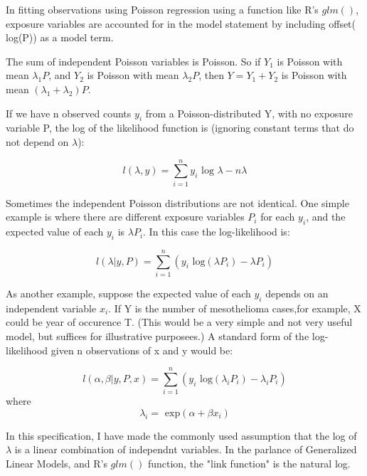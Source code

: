 \documentclass[paper=letter,listof=leveldown,appendixprefix=true]{scrreprt}\usepackage{graphicx, color}
\begin{document}
In fitting observations using Poisson regression using a function like R's $glm()$, exposure variables are accounted for in the model statement by including offset( log(P)) as a model term.

The sum of independent Poisson variables is Poisson.  So if $Y_1$ is Poisson with mean $\lambda_1 P$, and $ Y_2$ is Poisson with mean $ \lambda_2 P$, then $ Y = Y_1 + Y_2$ is Poisson with mean $ (\lambda_1 + \lambda_2)P$.

If we have n observed counts $y_i$ from a Poisson-distributed Y, with no exposure variable P, the log of the likelihood function is (ignoring constant terms that do not depend on $\lambda$):

\begin{equation*}
l(\lambda,y) = \sum\limits_{i=1}^n y_i \text{ log }\lambda - n\lambda
\end{equation*}

Sometimes the independent Poisson distributions are not identical.  One simple example is where there are different exposure variables $P_i$ for each $y_i$, and the expected value of each $y_i$ is $\lambda P_i$.  In this case the log-likelihood is:

\begin{equation*}
l(\lambda|y,P) = \sum\limits_{i=1}^n (y_i \text{ log}(\lambda P_i) - \lambda P_i)
\end{equation*}

As another example, suppose the expected value of each $y_i$ depends on an independent variable $x_i$.  If Y is the number of mesothelioma cases,for example, X could be year of occurence T.  (This would be a very simple and not very useful model, but suffices for illustrative purposees.)  A standard form of the log-likelihood given n observations of x and y would be:

\begin{equation*}
l(\alpha, \beta|y,P,x) = \sum\limits_{i=1}^n (y_i \text{ log}(\lambda_i P_i) - \lambda_i P_i)
\end{equation*} 
where
\begin{equation*}
\lambda_i = \text{ exp}(\alpha + \beta x_i)
\end{equation*}

In this specification, I have made the commonly used assumption that the log of $\lambda$ is a linear combination of independnt variables.  In the parlance of Generalized Linear Models, and R's $glm()$ function, the "link function" is the natural log.
\end{document}

